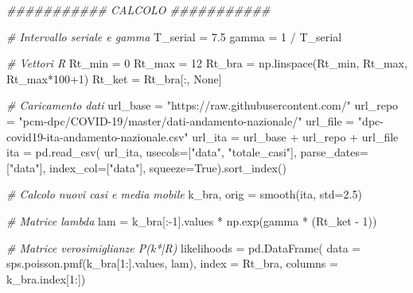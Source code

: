 \documentclass[11pt]{article}
\newenvironment{Shaded}{}{}
\newcommand{\DecValTok}[1]{\textcolor[rgb]{0.25,0.63,0.44}{{#1}}}
\newcommand{\FloatTok}[1]{\textcolor[rgb]{0.25,0.63,0.44}{{#1}}}
\newcommand{\StringTok}[1]{\textcolor[rgb]{0.25,0.44,0.63}{{#1}}}
\newcommand{\CommentTok}[1]{\textcolor[rgb]{0.38,0.63,0.69}{\textit{{#1}}}}
\newcommand{\NormalTok}[1]{{#1}}
\newcommand{\VariableTok}[1]{\textcolor[rgb]{0.10,0.09,0.49}{{#1}}}
\newcommand{\OperatorTok}[1]{\textcolor[rgb]{0.40,0.40,0.40}{{#1}}}
\begin{document}
\begin{Shaded}
\begin{Highlighting}[]
\CommentTok{\#\#\#\#\#\#\#\#\#\#\# CALCOLO \#\#\#\#\#\#\#\#\#\#\#}

\CommentTok{\# Intervallo seriale e gamma}
\NormalTok{T\_serial }\OperatorTok{=} \FloatTok{7.5}
\NormalTok{gamma }\OperatorTok{=} \DecValTok{1} \OperatorTok{/}\NormalTok{ T\_serial}

\CommentTok{\# Vettori R}
\NormalTok{Rt\_min }\OperatorTok{=} \DecValTok{0}
\NormalTok{Rt\_max }\OperatorTok{=} \DecValTok{12}
\NormalTok{Rt\_bra }\OperatorTok{=}\NormalTok{ np.linspace(Rt\_min, Rt\_max, Rt\_max}\OperatorTok{*}\DecValTok{100}\OperatorTok{+}\DecValTok{1}\NormalTok{)}
\NormalTok{Rt\_ket }\OperatorTok{=}\NormalTok{ Rt\_bra[:, }\VariableTok{None}\NormalTok{]}

\CommentTok{\# Caricamento dati}
\NormalTok{url\_base }\OperatorTok{=} \StringTok{"https://raw.githubusercontent.com/"}
\NormalTok{url\_repo }\OperatorTok{=} \StringTok{"pcm{-}dpc/COVID{-}19/master/dati{-}andamento{-}nazionale/"}
\NormalTok{url\_file }\OperatorTok{=} \StringTok{"dpc{-}covid19{-}ita{-}andamento{-}nazionale.csv"} 
\NormalTok{url\_ita }\OperatorTok{=}\NormalTok{ url\_base }\OperatorTok{+}\NormalTok{ url\_repo }\OperatorTok{+}\NormalTok{ url\_file}
\NormalTok{ita }\OperatorTok{=}\NormalTok{ pd.read\_csv(}
\NormalTok{    url\_ita,}
\NormalTok{    usecols}\OperatorTok{=}\NormalTok{[}\StringTok{"data"}\NormalTok{, }\StringTok{"totale\_casi"}\NormalTok{],}
\NormalTok{    parse\_dates}\OperatorTok{=}\NormalTok{[}\StringTok{"data"}\NormalTok{],}
\NormalTok{    index\_col}\OperatorTok{=}\NormalTok{[}\StringTok{"data"}\NormalTok{],}
\NormalTok{    squeeze}\OperatorTok{=}\VariableTok{True}\NormalTok{).sort\_index()}

\CommentTok{\# Calcolo nuovi casi e media mobile}
\NormalTok{k\_bra, orig }\OperatorTok{=}\NormalTok{ smooth(ita, std}\OperatorTok{=}\FloatTok{2.5}\NormalTok{)}

\CommentTok{\# Matrice lambda}
\NormalTok{lam }\OperatorTok{=}\NormalTok{ k\_bra[:}\OperatorTok{{-}}\DecValTok{1}\NormalTok{].values }\OperatorTok{*}\NormalTok{ np.exp(gamma }\OperatorTok{*}\NormalTok{ (Rt\_ket }\OperatorTok{{-}} \DecValTok{1}\NormalTok{))}

\CommentTok{\# Matrice verosimiglianze P(k*|R)}
\NormalTok{likelihoods }\OperatorTok{=}\NormalTok{ pd.DataFrame(}
\NormalTok{    data }\OperatorTok{=}\NormalTok{ sps.poisson.pmf(k\_bra[}\DecValTok{1}\NormalTok{:].values, lam),}
\NormalTok{    index }\OperatorTok{=}\NormalTok{ Rt\_bra,}
\NormalTok{    columns }\OperatorTok{=}\NormalTok{ k\_bra.index[}\DecValTok{1}\NormalTok{:])}


\end{Highlighting}
\end{Shaded}
\end{document}
